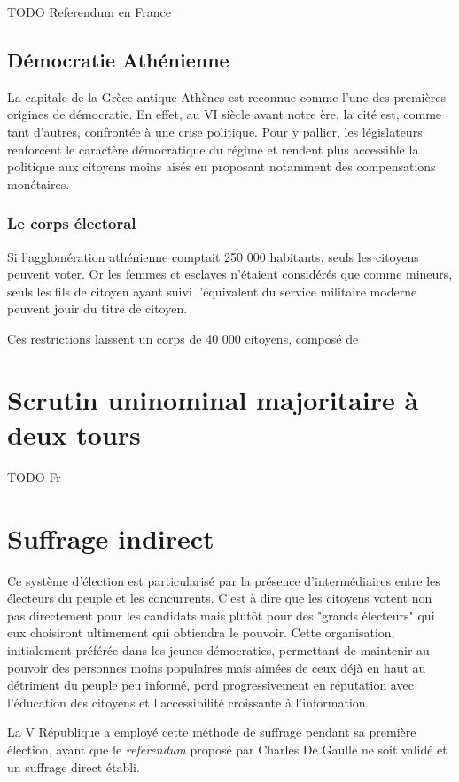 \documentclass[11pt,a4paper]{report}
\begin{document}
TODO Referendum en France
\section{Démocratie Athénienne}
La capitale de la Grèce antique Athènes est reconnue comme l'une des premières origines de démocratie. 
En effet, au VI siècle avant notre ère, la cité est, comme tant d'autres, confrontée à une crise politique. 
Pour y pallier, les législateurs renforcent le caractère démocratique du régime et rendent plus accessible la politique aux citoyens moins aisés en proposant notamment des compensations monétaires.

\subsection{Le corps électoral}
Si l'agglomération athénienne comptait 250 000 habitants\nocite{persee:popu}, seuls les citoyens peuvent voter. 
Or les femmes et esclaves n'étaient considérés que comme mineurs, seuls les fils de citoyen ayant suivi l'équivalent du service militaire moderne peuvent jouir du titre de citoyen.
 
Ces restrictions laissent un corps de 40 000 citoyens, composé de 


\chapter{Scrutin uninominal majoritaire à deux tours}
TODO Fr

\chapter{Suffrage indirect}
Ce système d'élection est particularisé par la présence d'intermédiaires entre les électeurs du peuple et les concurrents. 
C'est à dire que les citoyens votent non pas directement pour les candidats mais plutôt pour des "grands électeurs" qui eux choisiront ultimement qui obtiendra le pouvoir.
Cette organisation, initialement préférée dans les jeunes démocraties, permettant de maintenir au pouvoir des personnes moins populaires mais aimées de ceux déjà en haut au détriment du peuple peu informé, perd progressivement en réputation avec l'éducation des citoyens et l'accessibilité croissante à l'information.

La V République a employé cette méthode de suffrage pendant sa première élection, avant que le \textit{referendum} proposé par Charles De Gaulle ne soit validé et un suffrage direct établi.
\end{document}
